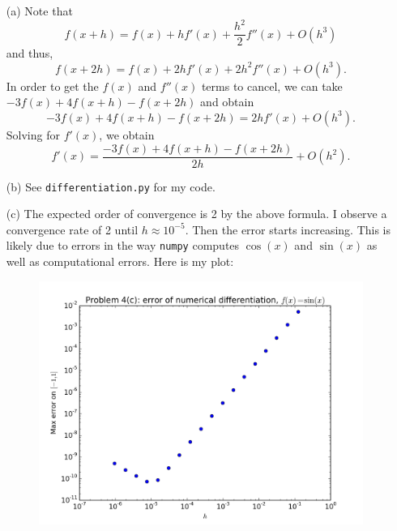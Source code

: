 \documentclass[10pt]{article}
\begin{document}
\newpage


\begin{itemize}

\item[(a)] Note that $$
f(x+h) = f(x) + hf'(x) + \frac{h^2}{2} f''(x) + O(h^3)
$$  and thus, $$
f(x+ 2h) = f(x) + 2hf'(x) + 2 h^2 f''(x) + O(h^3).
$$ In order to get the $f(x)$ and $ f''(x) $ terms to cancel, we can take $ -3 f(x) + 4f(x+h) - f(x+2h) $ and obtain $$
-3 f(x) + 4f(x+h) - f(x+2h) = 2h f'(x) + O(h^3).
$$ Solving for $ f'(x) $, we obtain $$
f'(x) = \frac{-3 f(x) + 4f(x+h) - f(x+2h)}{2h} + O(h^2).
$$

\item[(b)] See \verb+differentiation.py+ for my code.

\item[(c)] The expected order of convergence is 2 by the above formula. I observe a convergence rate of 2 until $ h \approx 10^{-5} $. Then the error starts increasing. This is likely due to errors in the way \verb+numpy+ computes $\cos(x)$ and $ \sin(x) $ as well as computational errors.  Here is my plot:

\begin{figure}[H]
  \centering
    \includegraphics[scale=0.6]{diff}
\end{figure}

\end{itemize}

\newpage

\end{document}
